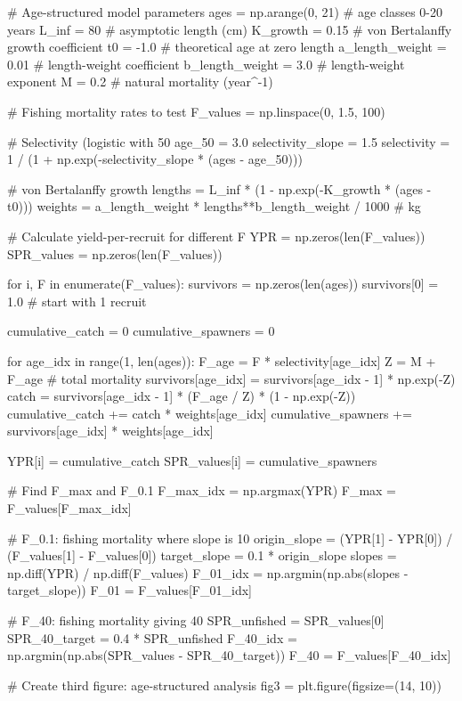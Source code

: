 \documentclass[a4paper, 11pt]{article}
\begin{document}
\begin{pycode}
# Age-structured model parameters
ages = np.arange(0, 21)  # age classes 0-20 years
L_inf = 80  # asymptotic length (cm)
K_growth = 0.15  # von Bertalanffy growth coefficient
t0 = -1.0  # theoretical age at zero length
a_length_weight = 0.01  # length-weight coefficient
b_length_weight = 3.0  # length-weight exponent
M = 0.2  # natural mortality (year^-1)

# Fishing mortality rates to test
F_values = np.linspace(0, 1.5, 100)

# Selectivity (logistic with 50%
age_50 = 3.0
selectivity_slope = 1.5
selectivity = 1 / (1 + np.exp(-selectivity_slope * (ages - age_50)))

# von Bertalanffy growth
lengths = L_inf * (1 - np.exp(-K_growth * (ages - t0)))
weights = a_length_weight * lengths**b_length_weight / 1000  # kg

# Calculate yield-per-recruit for different F
YPR = np.zeros(len(F_values))
SPR_values = np.zeros(len(F_values))

for i, F in enumerate(F_values):
    survivors = np.zeros(len(ages))
    survivors[0] = 1.0  # start with 1 recruit

    cumulative_catch = 0
    cumulative_spawners = 0

    for age_idx in range(1, len(ages)):
        F_age = F * selectivity[age_idx]
        Z = M + F_age  # total mortality
        survivors[age_idx] = survivors[age_idx - 1] * np.exp(-Z)
        catch = survivors[age_idx - 1] * (F_age / Z) * (1 - np.exp(-Z))
        cumulative_catch += catch * weights[age_idx]
        cumulative_spawners += survivors[age_idx] * weights[age_idx]

    YPR[i] = cumulative_catch
    SPR_values[i] = cumulative_spawners

# Find F_max and F_0.1
F_max_idx = np.argmax(YPR)
F_max = F_values[F_max_idx]

# F_0.1: fishing mortality where slope is 10%
origin_slope = (YPR[1] - YPR[0]) / (F_values[1] - F_values[0])
target_slope = 0.1 * origin_slope
slopes = np.diff(YPR) / np.diff(F_values)
F_01_idx = np.argmin(np.abs(slopes - target_slope))
F_01 = F_values[F_01_idx]

# F_40: fishing mortality giving 40%
SPR_unfished = SPR_values[0]
SPR_40_target = 0.4 * SPR_unfished
F_40_idx = np.argmin(np.abs(SPR_values - SPR_40_target))
F_40 = F_values[F_40_idx]

# Create third figure: age-structured analysis
fig3 = plt.figure(figsize=(14, 10))


\end{pycode}
\end{document}
